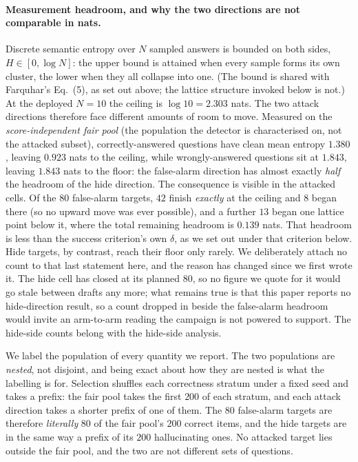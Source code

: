 \paragraph{Measurement headroom, and why the two directions are not comparable in nats.}
Discrete semantic entropy over $N$ sampled answers is bounded on both sides,
$H \in [0, \log N]$: the upper bound is attained when every sample forms its own cluster, the
lower when they all collapse into one. (The bound is shared with Farquhar's Eq.~(5), as set
out above; the lattice structure invoked below is not.) At the deployed $N{=}10$ the ceiling is $\log 10 = 2.303$ nats. The
two attack directions therefore face different amounts of room to move. Measured on the
\emph{score-independent fair pool} (the population the detector is characterised on, not the
attacked subset), correctly-answered questions have clean mean entropy $1.380$, leaving
$0.923$ nats to the ceiling, while wrongly-answered questions sit at $1.843$, leaving
$1.843$ nats to the floor: the false-alarm direction has almost exactly \emph{half} the
headroom of the hide direction. The consequence is visible in the attacked cells. Of the
$80$ false-alarm targets, $42$ finish \emph{exactly} at the ceiling and $8$ began there (so
no upward move was ever possible), and a further $13$ began one lattice point below it,
where the total remaining headroom is $0.139$ nats. That headroom is less than the success
criterion's own $\delta$, as we set out under that criterion below. Hide targets, by
contrast, reach their floor only rarely. We
deliberately attach no count to that last statement here, and the reason has changed since we
first wrote it. The hide cell has closed at its planned $80$, so no figure we quote for it
would go stale between drafts any more; what remains true is that this paper reports no
hide-direction result, so a count dropped in beside the false-alarm headroom would invite an
arm-to-arm reading the campaign is not powered to support. The hide-side counts belong with
the hide-side analysis.

We label the population of every quantity we report. The two populations are \emph{nested},
not disjoint, and being exact about how they are nested is what the labelling is for.
Selection shuffles each correctness stratum under a fixed seed and takes a prefix: the fair
pool takes the first $200$ of each stratum, and each attack direction takes a shorter prefix
of one of them. The $80$ false-alarm targets are therefore \emph{literally} $80$ of the fair
pool's $200$ correct items, and the hide targets are in the same way a prefix of its $200$
hallucinating ones. No attacked target lies outside the fair pool, and the two are not
different sets of questions.

